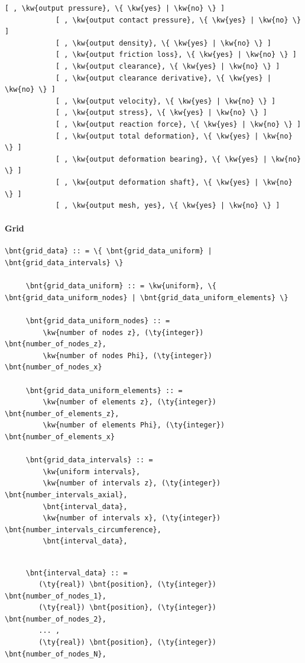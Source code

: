 \begin{Verbatim}[commandchars=\\\{\}]
            [ , \kw{output pressure}, \{ \kw{yes} | \kw{no} \} ]
            [ , \kw{output contact pressure}, \{ \kw{yes} | \kw{no} \} ]
            [ , \kw{output density}, \{ \kw{yes} | \kw{no} \} ]
            [ , \kw{output friction loss}, \{ \kw{yes} | \kw{no} \} ]
            [ , \kw{output clearance}, \{ \kw{yes} | \kw{no} \} ]
            [ , \kw{output clearance derivative}, \{ \kw{yes} | \kw{no} \} ]
            [ , \kw{output velocity}, \{ \kw{yes} | \kw{no} \} ]
            [ , \kw{output stress}, \{ \kw{yes} | \kw{no} \} ]
            [ , \kw{output reaction force}, \{ \kw{yes} | \kw{no} \} ]
            [ , \kw{output total deformation}, \{ \kw{yes} | \kw{no} \} ]
            [ , \kw{output deformation bearing}, \{ \kw{yes} | \kw{no} \} ]
            [ , \kw{output deformation shaft}, \{ \kw{yes} | \kw{no} \} ]
            [ , \kw{output mesh, yes}, \{ \kw{yes} | \kw{no} \} ]

\end{Verbatim}
\paragraph{Grid}
\begin{Verbatim}[commandchars=\\\{\}]
     \bnt{grid_data} :: = \{ \bnt{grid_data_uniform} | \bnt{grid_data_intervals} \}

     \bnt{grid_data_uniform} :: = \kw{uniform}, \{ \bnt{grid_data_uniform_nodes} | \bnt{grid_data_uniform_elements} \}

     \bnt{grid_data_uniform_nodes} :: =
         \kw{number of nodes z}, (\ty{integer}) \bnt{number_of_nodes_z},
         \kw{number of nodes Phi}, (\ty{integer}) \bnt{number_of_nodes_x}

     \bnt{grid_data_uniform_elements} :: =
         \kw{number of elements z}, (\ty{integer}) \bnt{number_of_elements_z},
         \kw{number of elements Phi}, (\ty{integer}) \bnt{number_of_elements_x}

     \bnt{grid_data_intervals} :: =
         \kw{uniform intervals},
         \kw{number of intervals z}, (\ty{integer}) \bnt{number_intervals_axial},
         \bnt{interval_data},
         \kw{number of intervals x}, (\ty{integer}) \bnt{number_intervals_circumference},
         \bnt{interval_data},
\end{Verbatim}
\begin{Verbatim}[commandchars=\\\{\}]

     \bnt{interval_data} :: =
        (\ty{real}) \bnt{position}, (\ty{integer}) \bnt{number_of_nodes_1},
        (\ty{real}) \bnt{position}, (\ty{integer}) \bnt{number_of_nodes_2},
        ... ,
        (\ty{real}) \bnt{position}, (\ty{integer}) \bnt{number_of_nodes_N},

\end{Verbatim}
